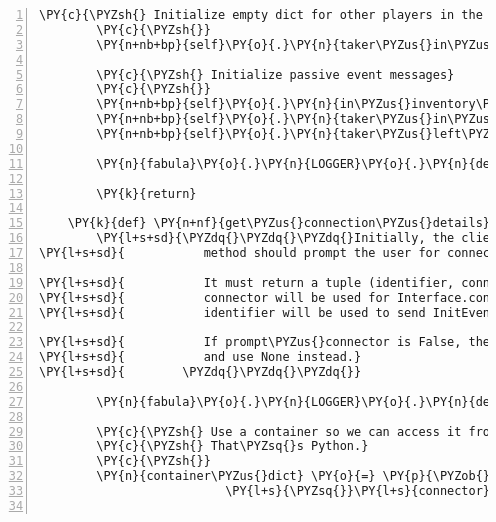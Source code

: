 \begin{Verbatim}[commandchars=\\\{\},numbers=left,firstnumber=1,stepnumber=1]
        \PY{c}{\PYZsh{} Initialize empty dict for other players in the same room}
        \PY{c}{\PYZsh{}}
        \PY{n+nb+bp}{self}\PY{o}{.}\PY{n}{taker\PYZus{}in\PYZus{}room\PYZus{}dict} \PY{o}{=} \PY{p}{\PYZob{}}\PY{p}{\PYZcb{}}

        \PY{c}{\PYZsh{} Initialize passive event messages}
        \PY{c}{\PYZsh{}}
        \PY{n+nb+bp}{self}\PY{o}{.}\PY{n}{in\PYZus{}inventory\PYZus{}msg} \PY{o}{=} \PY{l+s}{\PYZdq{}}\PY{l+s}{\PYZob{}\PYZcb{} in inventory}\PY{l+s}{\PYZdq{}}
        \PY{n+nb+bp}{self}\PY{o}{.}\PY{n}{taker\PYZus{}in\PYZus{}room\PYZus{}msg} \PY{o}{=} \PY{l+s}{\PYZdq{}}\PY{l+s}{\PYZob{}\PYZcb{} is in the room}\PY{l+s}{\PYZdq{}}
        \PY{n+nb+bp}{self}\PY{o}{.}\PY{n}{taker\PYZus{}left\PYZus{}room\PYZus{}msg} \PY{o}{=} \PY{l+s}{\PYZdq{}}\PY{l+s}{\PYZob{}\PYZcb{} left the room}\PY{l+s}{\PYZdq{}}

        \PY{n}{fabula}\PY{o}{.}\PY{n}{LOGGER}\PY{o}{.}\PY{n}{debug}\PY{p}{(}\PY{l+s}{\PYZdq{}}\PY{l+s}{complete}\PY{l+s}{\PYZdq{}}\PY{p}{)}

        \PY{k}{return}

    \PY{k}{def} \PY{n+nf}{get\PYZus{}connection\PYZus{}details}\PY{p}{(}\PY{n+nb+bp}{self}\PY{p}{,} \PY{n}{prompt\PYZus{}connector}\PY{o}{=}\PY{n+nb+bp}{True}\PY{p}{)}\PY{p}{:}
        \PY{l+s+sd}{\PYZdq{}\PYZdq{}\PYZdq{}Initially, the client Interface is not connected to the Server. This}
\PY{l+s+sd}{           method should prompt the user for connection details.}

\PY{l+s+sd}{           It must return a tuple (identifier, connector), where}
\PY{l+s+sd}{           connector will be used for Interface.connect(connector) and}
\PY{l+s+sd}{           identifier will be used to send InitEvent(identifier) to the server.}

\PY{l+s+sd}{           If prompt\PYZus{}connector is False, the dialog will not ask for a connector}
\PY{l+s+sd}{           and use None instead.}
\PY{l+s+sd}{        \PYZdq{}\PYZdq{}\PYZdq{}}

        \PY{n}{fabula}\PY{o}{.}\PY{n}{LOGGER}\PY{o}{.}\PY{n}{debug}\PY{p}{(}\PY{l+s}{\PYZdq{}}\PY{l+s}{called}\PY{l+s}{\PYZdq{}}\PY{p}{)}

        \PY{c}{\PYZsh{} Use a container so we can access it from an ad\PYZhy{}hoc function.}
        \PY{c}{\PYZsh{} That\PYZsq{}s Python.}
        \PY{c}{\PYZsh{}}
        \PY{n}{container\PYZus{}dict} \PY{o}{=} \PY{p}{\PYZob{}}\PY{l+s}{\PYZsq{}}\PY{l+s}{login\PYZus{}name}\PY{l+s}{\PYZsq{}} \PY{p}{:} \PY{l+s}{\PYZsq{}}\PY{l+s}{player}\PY{l+s}{\PYZsq{}}\PY{p}{,}
                          \PY{l+s}{\PYZsq{}}\PY{l+s}{connector}\PY{l+s}{\PYZsq{}} \PY{p}{:} \PY{n+nb+bp}{None}\PY{p}{\PYZcb{}}


\end{Verbatim}
